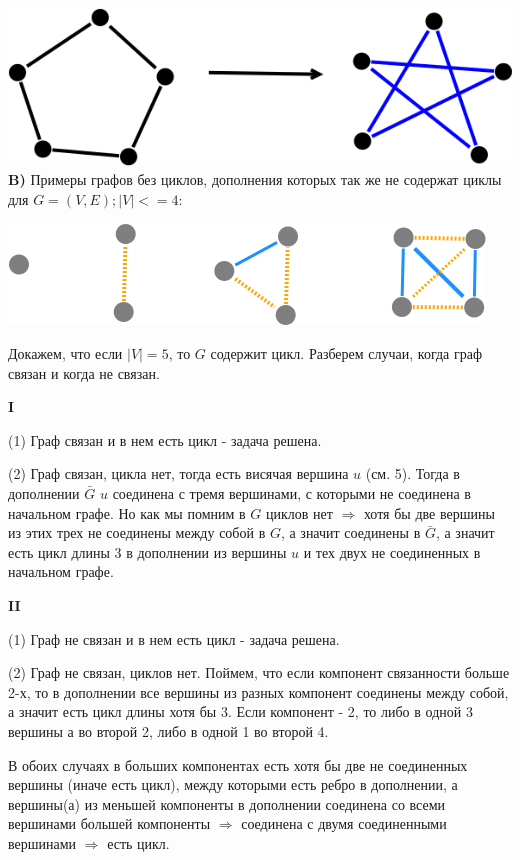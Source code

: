 \documentclass{article}
\begin{document}
\includegraphics[scale=0.5]{6_4.png}
\\
\textbf{B)} Примеры графов без циклов, дополнения которых так же не содержат циклы для $G = (V, E); |V| <= 4 $:

\includegraphics[scale=0.5]{6_5.png}

Докажем, что если $|V| = 5$, то $G$ содержит цикл.
Разберем случаи, когда граф связан и когда не связан.

\textbf{I} 

(1) Граф связан и в нем есть цикл - задача решена.

(2) Граф связан, цикла нет, тогда есть висячая вершина $u$ (см. 5). Тогда в дополнении $ \bar{G} $ $u$ соединена с тремя вершинами, с которыми не соединена в начальном графе. Но как мы помним в $G$ циклов нет $\Rightarrow$ хотя бы две вершины из этих трех не соединены между собой в $G$, а значит соединены в $\bar{G}$, а значит есть цикл длины 3 в дополнении из вершины $u$ и тех двух не соединенных в начальном графе.

\textbf{II} 

(1) Граф не связан и в нем есть цикл - задача решена.

(2) Граф не связан, циклов нет. Поймем, что если компонент связанности больше 2-х, то в дополнении все вершины из разных компонент соединены между собой, а значит есть цикл длины хотя бы 3. Если компонент - 2, то либо в одной 3 вершины а во второй 2, либо в одной 1 во второй 4.

В обоих случаях в больших компонентах есть хотя бы две не соединенных вершины (иначе есть цикл), между которыми есть ребро в дополнении, а вершины(а) из меньшей компоненты в дополнении соединена со всеми вершинами большей компоненты $\Rightarrow$ соединена с двумя соединенными вершинами $ \Rightarrow $ есть цикл. 	
\end{document}
